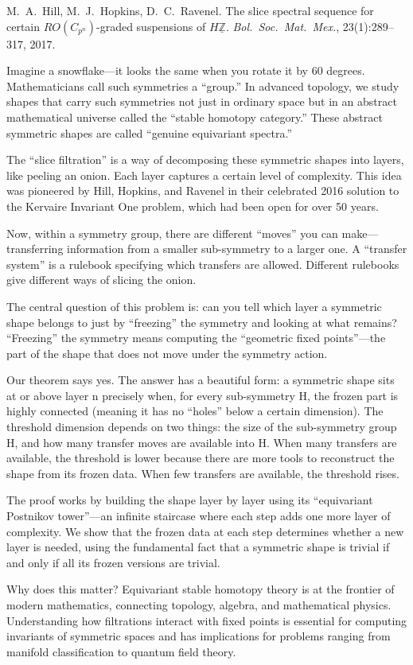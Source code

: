  M.~A.~Hill, M.~J.~Hopkins, D.~C.~Ravenel.
The slice spectral sequence for certain $RO(C_{p^n})$-graded suspensions
of $H\underline{\mathbb{Z}}$.
\emph{Bol.\ Soc.\ Mat.\ Mex.}, 23(1):289--317, 2017.


Imagine a snowflake---it looks the same when you rotate it by 60 degrees. Mathematicians call such symmetries a ``group.'' In advanced topology, we study shapes that carry such symmetries not just in ordinary space but in an abstract mathematical universe called the ``stable homotopy category.'' These abstract symmetric shapes are called ``genuine equivariant spectra.''

The ``slice filtration'' is a way of decomposing these symmetric shapes into layers, like peeling an onion. Each layer captures a certain level of complexity. This idea was pioneered by Hill, Hopkins, and Ravenel in their celebrated 2016 solution to the Kervaire Invariant One problem, which had been open for over 50 years.

Now, within a symmetry group, there are different ``moves'' you can make---transferring information from a smaller sub-symmetry to a larger one. A ``transfer system'' is a rulebook specifying which transfers are allowed. Different rulebooks give different ways of slicing the onion.

The central question of this problem is: can you tell which layer a symmetric shape belongs to just by ``freezing'' the symmetry and looking at what remains? ``Freezing'' the symmetry means computing the ``geometric fixed points''---the part of the shape that does not move under the symmetry action.

Our theorem says yes. The answer has a beautiful form: a symmetric shape sits at or above layer n precisely when, for every sub-symmetry H, the frozen part is highly connected (meaning it has no ``holes'' below a certain dimension). The threshold dimension depends on two things: the size of the sub-symmetry group H, and how many transfer moves are available into H. When many transfers are available, the threshold is lower because there are more tools to reconstruct the shape from its frozen data. When few transfers are available, the threshold rises.

The proof works by building the shape layer by layer using its ``equivariant Postnikov tower''---an infinite staircase where each step adds one more layer of complexity. We show that the frozen data at each step determines whether a new layer is needed, using the fundamental fact that a symmetric shape is trivial if and only if all its frozen versions are trivial.

Why does this matter? Equivariant stable homotopy theory is at the frontier of modern mathematics, connecting topology, algebra, and mathematical physics. Understanding how filtrations interact with fixed points is essential for computing invariants of symmetric spaces and has implications for problems ranging from manifold classification to quantum field theory.
